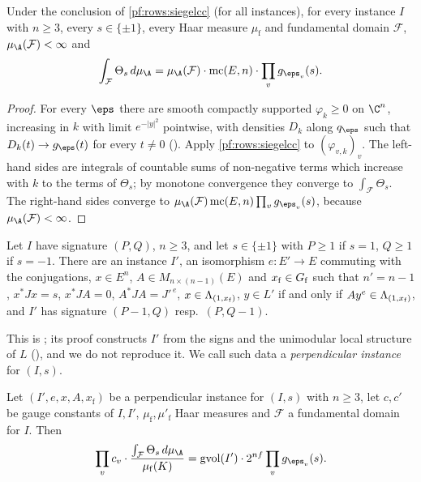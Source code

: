 \begin{lemma}\label{pf:rows:siegelgauss}
Under the conclusion of \cref{pf:rows:siegelcc} (for all instances), for every instance $I$ with $n\ge3$, every
$s\in\{\pm1\}$, every Haar measure $\mu_{\mathrm f}$ and fundamental domain $\mathcal F$, $\mu_{\A}(\mathcal F)<\infty$ and
\[
\int_{\mathcal F}\Theta_s\,d\mu_{\A}=\mu_{\A}(\mathcal F)\cdot\rowsmc(E,n)\cdot\prod_vg_{\eps_v}(s).
\]
\end{lemma}

\begin{proof}
For every $\eps$ there are smooth compactly supported $\varphi_k\ge0$ on $\C^n$, increasing in $k$ with limit $e^{-|y|^2}$
pointwise, with densities $D_k$ along $q_\eps$ such that $D_k(t)\to g_\eps(t)$ for every $t\ne0$
(). Apply \cref{pf:rows:siegelcc} to
$(\varphi_{v,k})_v$. The left-hand sides are integrals of countable sums of non-negative terms which increase with $k$
to the terms of $\Theta_s$; by monotone convergence they converge to $\int_{\mathcal F}\Theta_s$. The right-hand sides
converge to $\mu_{\A}(\mathcal F)\rowsmc(E,n)\prod_vg_{\eps_v}(s)$, because $\mu_{\A}(\mathcal F)<\infty$.
\end{proof}

\begin{lemma}\label{pf:rows:perp}
Let $I$ have signature $(P,Q)$, $n\ge3$, and let $s\in\{\pm1\}$ with $P\ge1$ if $s=1$, $Q\ge1$ if $s=-1$. There are an
instance $I'$, an isomorphism $e:E'\to E$ commuting with the conjugations, $x\in E^n$, $A\in M_{n\times(n-1)}(E)$ and
$x_{\mathrm f}\in G_{\mathrm f}$ such that $n'=n-1$, $x^*Jx=s$, $x^*JA=0$, $A^*JA=J'^{\,e}$, $x\in\Lambda_{(1,x_{\mathrm f})}$,
$y\in L'$ if and only if $Ay^e\in\Lambda_{(1,x_{\mathrm f})}$, and $I'$ has signature $(P-1,Q)$ resp.\ $(P,Q-1)$.
\end{lemma}

This is ; its proof constructs $I'$ from
the signs and the unimodular local structure of $L$ (), and we do
not reproduce it. We call such data a \emph{perpendicular instance} for $(I,s)$.

\begin{lemma}\label{pf:rows:unfold}
Let $(I',e,x,A,x_{\mathrm f})$ be a perpendicular instance for $(I,s)$ with $n\ge3$, let $c,c'$ be gauge constants of
$I,I'$, $\mu_{\mathrm f},\mu'_{\mathrm f}$ Haar measures and $\mathcal F$ a fundamental domain for $I$. Then
\[
\prod_vc_v\cdot\frac{\int_{\mathcal F}\Theta_s\,d\mu_{\A}}{\mu_{\mathrm f}(K)}=\rowsgv(I')\cdot 2^{nf}\prod_vg_{\eps_v}(s).
\]
\end{lemma}

